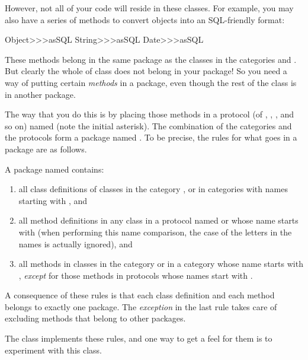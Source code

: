 \documentclass[a4paper,10pt,twoside]{book}
\begin{document}
However, not all of your code will reside in these classes.
For example, you may also have a series of methods to convert objects into an SQL-friendly format:

\begin{code}{}
Object>>>asSQL
String>>>asSQL
Date>>>asSQL
\end{code}

\noindent
These methods belong in  the same package as the classes in the categories  and .
But clearly the whole of class  does not belong in your package!
So you need a way of putting certain \emph{methods} in a package, even though the rest of the class is in another package.

The way that you do this is by placing those methods in a protocol (of , , , and so on) named  (note the initial asterisk).
The combination of the  categories and the  protocols form a package named .
To be precise, the rules for what goes in a package are as follows.

A package named  contains:

\begin{enumerate}		\label{sec:packageRules}
	\item{} all class definitions of classes in the category , or in categories with names starting with ,
	and
	\item{} \label{env:extensions} all method definitions in any class in a protocol named  or whose name starts with  (when performing this name comparison, the case of the letters in the names is actually ignored),
	and
	\item{} all methods in classes in the category  or in a category whose name starts with , \emph{except} for those methods in protocols whose names start with \prot{*}.
\end{enumerate}
\noindent
A consequence of these rules is that each class definition and each method belongs to exactly one package.
The \emph{exception} in the last rule takes care of excluding methods that belong to other packages.

The class  implements these rules, and one way to get a feel for them is to experiment with this class.
\end{document}
